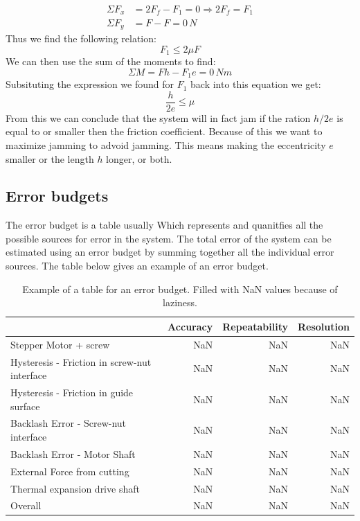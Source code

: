 \documentclass[11pt, a4paper]{article}
\numberwithin{equation}{section}
\numberwithin{figure}{section}
\begin{document}
\begin{align}
  \Sigma F_x &= 2F_f - F_1 = 0 \Rightarrow 2F_f = F_1\\
  \Sigma F_y &= F - F = 0\,N
\end{align}
Thus we find the following relation:
\begin{equation}
  F_1 \leq 2\mu F
\end{equation}
We can then use the sum of the moments to find:
\begin{equation}
  \Sigma M = Fh - F_1 e = 0\,Nm
\end{equation}
Subsituting the expression we found for $F_1$ back into this equation we get:
\begin{equation}
  \frac{h}{2e} \leq \mu
\end{equation}
From this we can conclude that the system will in fact jam if the ration $h/2e$ is equal to or smaller then the friction coefficient. Because of this we want to maximize jamming to advoid jamming. This means making the eccentricity $e$ smaller or the length $h$ longer, or both.


\subsection{Error budgets}
The error budget is a table usually Which represents and quanitfies all the possible sources for error in the system. The total error of the system can be estimated using an error budget by summing together all the individual error sources. The table below gives an example of an error budget.
\begin{table}[h]
  \caption{Example of a table for an error budget. Filled with NaN values because of laziness.} %
  \centering %
  \begin{tabular}{l|rrr} %
    \hline\hline %
    & Accuracy & Repeatability & Resolution \\ [0.5ex] %
    \hline %
    Stepper Motor + screw                        & NaN & NaN & NaN\\ 
    Hysteresis - Friction in screw-nut interface & NaN & NaN & NaN\\
    Hysteresis - Friction in guide surface       & NaN & NaN & NaN\\
    Backlash Error - Screw-nut interface         & NaN & NaN & NaN\\
    Backlash Error - Motor Shaft                 & NaN & NaN & NaN\\
    External Force from cutting                  & NaN & NaN & NaN\\
    Thermal expansion drive shaft                & NaN & NaN & NaN\\
    \hline
    Overall                                      & NaN & NaN & NaN\\
  \hline %
  \end{tabular}
  \label{tab:hresult}
\end{table}
\end{document}
